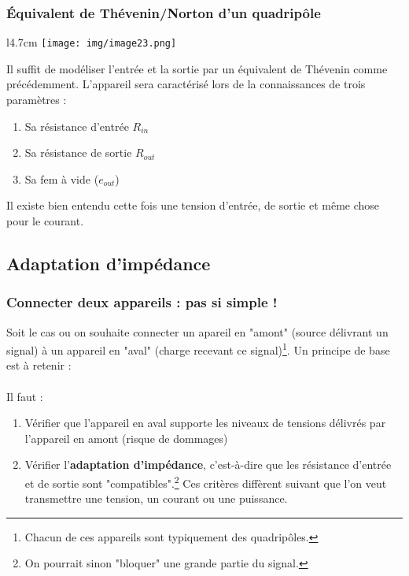 \setcounter{subsection}{3}
\subsubsection{Équivalent de Thévenin/Norton d'un quadripôle}
\begin{wrapfigure}[8]{l}{4.7cm}
	\texttt{[image: img/image23.png]}
\end{wrapfigure}
Il suffit de modéliser l'entrée et la sortie par un équivalent de Thévenin comme précédemment. L'appareil sera caractérisé lors de la connaissances de trois paramètres :
\begin{enumerate}
	\item Sa résistance d'entrée $R_{in}$
	\item Sa résistance de sortie $R_{out}$
	\item Sa fem à vide ($e_{out}$)
\end{enumerate}
Il existe bien entendu cette fois une tension d'entrée, de sortie et même chose pour le courant.


\subsection{Adaptation d'impédance}
\subsubsection{Connecter deux appareils : pas si simple !}
Soit le cas ou on souhaite connecter un apareil en "amont" (source délivrant un signal) à un appareil en "aval" (charge recevant ce signal)\footnote{Chacun de ces appareils sont typiquement des quadripôles.}. Un principe de base est à retenir :\\
\ \\

Il faut :
\begin{enumerate}
	\item Vérifier que l'appareil en aval supporte les niveaux de tensions délivrés par l'appareil en amont (risque de dommages)
	\item Vérifier l'\textbf{adaptation d'impédance}, c'est-à-dire que les résistance d'entrée et de sortie sont "compatibles".\footnote{On pourrait sinon "bloquer" une grande partie du signal.} Ces critères diffèrent suivant que l'on veut transmettre une tension, un courant ou une puissance.
\end{enumerate}


